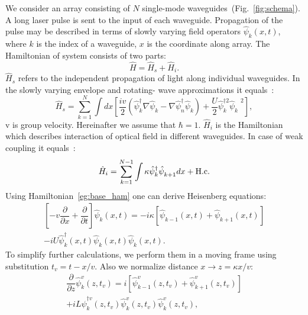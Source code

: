 \documentclass[9pt,twocolumn,twoside]{osajnl}
\begin{document}
\par
We consider an array consisting of $N$ single-mode waveguides~(Fig.~\ref{fig:schema}). 
A long laser pulse is sent to the input of each waveguide. Propagation of the pulse may be described in terms of slowly varying field operators $\hat{\psi}_{k}\left(x,t\right)$, where $k$ is the index of a waveguide, $x$ is the coordinate along array. The Hamiltonian of system consists of two parts:
\begin{equation}\label{eg:base_ham}
	\hat{H}=\hat{H}_s + \hat{H}_i.
\end{equation}
$\hat{H}_s$ refers to the independent propagation of light along individual waveguides.
In the slowly varying envelope and rotating-
wave approximations it equals~\cite{drummond_quantum_2014}: 
\begin{equation}
	\hat{H}_s = \sum^{N}_{k=1}\int dx\left[\dfrac{iv}{2}\left(\hat{\psi}^{\dag}_k\nabla\hat{\psi}^{\phantom{\dag}}_k - \nabla\hat{\psi}^{\dag}_n\hat{\psi}^{\phantom{\dag}}_k\right) +\dfrac{U}{2}\hat{\psi}^{\dag2}_k\hat{\psi}^{\phantom{\dag}2}_k\right], 
\end{equation}
v is group velocity. Hereinafter we assume that $\hbar=1$. $\hat{H}_i$ is the Hamiltonian which describes interaction of optical field in different waveguides. In case of weak coupling it equals~\cite{agarwal_quantum_2012}:
\begin{equation}
	\hat{H}_i = \sum^{N-1}_{k=1}\int \kappa\hat{\psi}^{\dag}_k\hat{\psi}^{\phantom{\dag}}_{k+1} dx +\rm{H.c.}
\end{equation}
Using Hamiltonian~\eqref{eg:base_ham} one can derive Heisenberg equations:
\begin{equation}
	\begin{array}{r}
		\left[-v\dfrac{\partial}{\partial x} + \dfrac{\partial}{\partial t}\right]\hat{\psi}^{\phantom{\dag}}_k\!\left(x,\!t\!\right) = -i\kappa\left[\hat{\psi}^{\phantom{\dag}}_{k-1}\!\left(x,\!t\!\right) + \hat{\psi}^{\phantom{\dag}}_{k+1}\!\left(x,\!t\!\right)\right] \\ -iU\hat{\psi}^{\dag}_k\!\left(x,\!t\!\right)\hat{\psi}^{\phantom{\dag}}_{k}\!\left(x,\!t\!\right)\hat{\psi}^{\phantom{\dag}}_{k}\!\left(x,\!t\!\right).
	\end{array}
\end{equation}
To simplify further calculations, we perform them in a moving frame using substitution $t_v = t - x/v$. Also we normalize distance $x \rightarrow z = \kappa x / v$:
\begin{equation}\label{eq:heis}
	\begin{array}{r}
		\dfrac{\partial}{\partial z}\hat{\psi}^{v}_k\!\left(z,\!t_v\!\right) = i\left[\hat{\psi}^{v}_{k-1}\!\left(z,\!t_v\!\right) + \hat{\psi}^{v}_{k+1}\!\left(z,\!t_v\!\right)\right] \\ +iL\hat{\psi}^{\dag v}_k\!\left(z,\!t_v\!\right)\hat{\psi}^{v}_{k}\!\left(z,\!t_v\!\right)\hat{\psi}^{v}_{k}\!\left(z,\!t_v\!\right),
	\end{array}
\end{equation}
\end{document}
